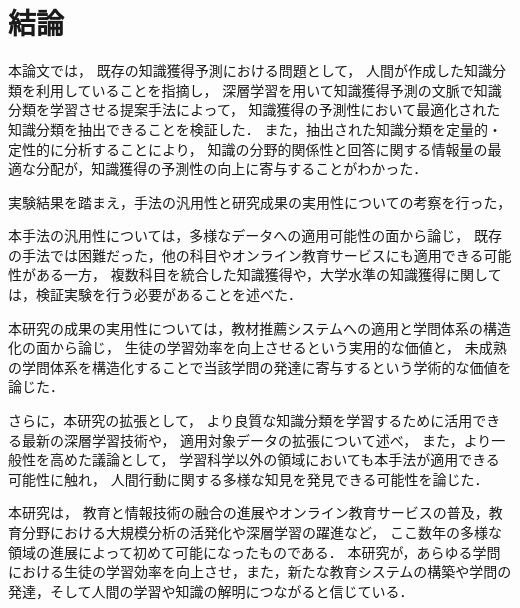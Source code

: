 \chapter{結論}
\label{chap:conlusion}
\fancyhf{}
\rhead{\thepage}
\cfoot{\thepage}


本論文では，
既存の知識獲得予測における問題として，
人間が作成した知識分類を利用していることを指摘し，
深層学習を用いて知識獲得予測の文脈で知識分類を学習させる提案手法によって，
知識獲得の予測性において最適化された知識分類を抽出できることを検証した．
また，抽出された知識分類を定量的・定性的に分析することにより，
知識の分野的関係性と回答に関する情報量の最適な分配が，知識獲得の予測性の向上に寄与することがわかった．
\vvspace

実験結果を踏まえ，手法の汎用性と研究成果の実用性についての考察を行った，

本手法の汎用性については，多様なデータへの適用可能性の面から論じ，
既存の手法では困難だった，他の科目やオンライン教育サービスにも適用できる可能性がある一方，
複数科目を統合した知識獲得や，大学水準の知識獲得に関しては，検証実験を行う必要があることを述べた．

本研究の成果の実用性については，教材推薦システムへの適用と学問体系の構造化の面から論じ，
生徒の学習効率を向上させるという実用的な価値と，
未成熟の学問体系を構造化することで当該学問の発達に寄与するという学術的な価値を論じた．


\vvspace

さらに，本研究の拡張として，
より良質な知識分類を学習するために活用できる最新の深層学習技術や，
適用対象データの拡張について述べ，
また，より一般性を高めた議論として，
学習科学以外の領域においても本手法が適用できる可能性に触れ，
人間行動に関する多様な知見を発見できる可能性を論じた．
\vvspace

本研究は，
教育と情報技術の融合の進展やオンライン教育サービスの普及，教育分野における大規模分析の活発化や深層学習の躍進など，
ここ数年の多様な領域の進展によって初めて可能になったものである．
本研究が，あらゆる学問における生徒の学習効率を向上させ，また，新たな教育システムの構築や学問の発達，そして人間の学習や知識の解明につながると信じている．
